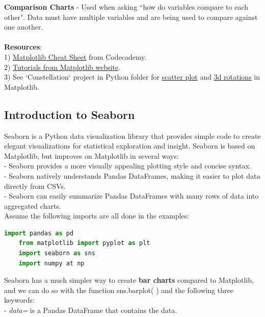 \documentclass[11pt, a4paper]{article}
\begin{document}
\begin{spacing}{1.1}
	\textbf{Comparison Charts} - Used when asking ``how do variables compare to each other". Data must have multiple variables and are being used to compare against one another. \\~\\
	\textbf{Resources}: \\
	1) \href{https://s3.amazonaws.com/codecademy-content/courses/matplotlib/data_vis_matplotlib_cheatsheet_v1_revisons.pdf}{Matplotlib Cheat Sheet} from Codecademy. \\
	2) \href{https://matplotlib.org/tutorials/index.html}{Tutorials from Matplotlib website}. \\
	3) See `Constellation` project in Python folder for \underline{scatter plot} and \underline{3d rotations} in Matplotlib. \newpage
	\subsection{Introduction to Seaborn}
	Seaborn is a Python data visualization library that provides simple code to create elegant visualizations for statistical exploration and insight. Seaborn is based on Matplotlib, but improves on Matplotlib in several ways: \\	
	\hspace*{3mm} - Seaborn provides a more visually appealing plotting style and concise syntax. \\
	\hspace*{3mm} - Seaborn natively understands Pandas DataFrames, making it easier to plot data directly from CSVs. \\
	\hspace*{3mm} - Seaborn can easily summarize Pandas DataFrames with many rows of data into aggregated charts. \vspace*{2mm}\\
	Assume the following imports are all done in the examples:
	\begin{lstlisting}[language=Python]
	import pandas as pd
	from matplotlib import pyplot as plt
	import seaborn as sns
	import numpy at np \end{lstlisting}\vspace*{1mm}
	Seaborn has a much simpler way to create \textbf{bar charts} compared to Matplotlib, and we can do so with the function sns.barplot( ) and the following three keywords: \\
	\hspace*{3mm} - \textit{data=} is a Pandas DataFrame that contains the data. \\

\end{spacing}
\end{document}
